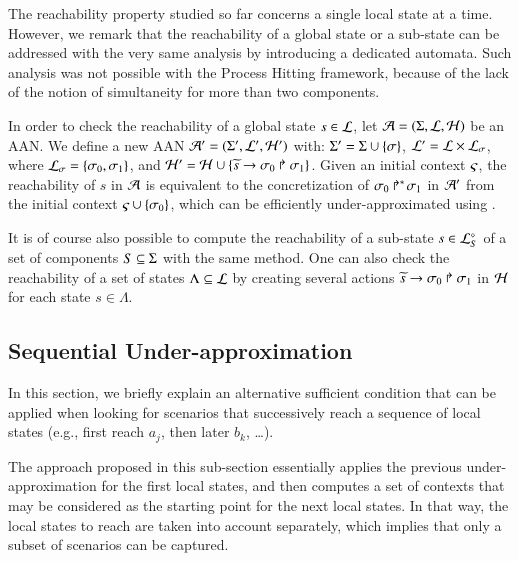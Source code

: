 \newcommand{\total}{\tau}
\newcommand{\reach}{\sigma}

The reachability property studied so far concerns a single local state at a time.
However, we remark that the reachability of a global state or a sub-state can be
addressed with the very same analysis by introducing a dedicated automata.
Such analysis was not possible with the Process Hitting framework,
because of the lack of the notion of simultaneity for more than two components.

In order to check the reachability of a global state $s \in \PHl$,
let $\PH = (\PHs, \PHl, \PHh)$ be an AAN.
We define a new AAN $\PH' = (\PHs', \PHl', \PHh')$ with:
$\PHs' = \PHs \cup \{ \reach \}$, $\PHl' = \PHl \times \PHl_\reach$,
where $\PHl_\reach = \{ \reach_0, \reach_1 \}$,
and $\PHh' = \PHh \cup \{ \PHhit{\toset{s}}{\reach_0}{\reach_1} \}$.
Given an initial context $\ctx$, the reachability of $s$ in $\PH$
is equivalent to the concretization of $\PHobjp{\reach}{0}{1}$ in $\PH'$
from the initial context $\ctx \cup \{ \reach_0 \}$,
which can be efficiently under-approximated using .

It is of course also possible to compute the reachability
of a sub-state $s \in \PHsubl[\PHl]_S$ of a set of components $S \subseteq \PHs$
with the same method.
One can also check the reachability of a set of states $\Lambda \subseteq \PHl$
by creating several actions
$\PHhit{\toset{s}}{\reach_0}{\reach_1}$ in $\PHh$ for each state $s \in \Lambda$.


\subsection{Sequential Under-approximation}
\label{ssec:ordered-ua}

In this section, we briefly explain an alternative sufficient condition that
can be applied when looking for scenarios that successively reach a sequence of local states (e.g.,
first reach $a_j$, then later $b_k$, \ldots).

The approach proposed in this sub-section essentially applies the previous under-approximation for
the first local states, and then computes a set of contexts that may be considered as the starting
point for the next local states.
In that way, the local states to reach are taken into account separately, which implies that only a
subset of scenarios can be captured.


